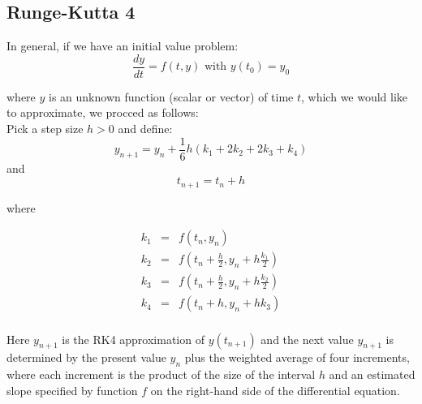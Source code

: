 \documentclass[12pt,a4paper,twoside]{report}
\begin{document}
\subsection{Runge-Kutta 4}
In general, if we have an initial value problem:
\begin{equation}
  \frac{dy}{dt} = f(t,y) \text{ with } y(t_0) = y_0
\end{equation}

where \( y \) is an unknown function (scalar or vector) of time \( t \), which we 
would like to approximate, we procced as follows:\\
Pick a step size \( h > 0 \) and define:
\begin{equation}
  y_{n+1} = y_n + \frac{1}{6} h (k_1 + 2 k_2 + 2 k_3 + k_4)
\end{equation}
and
\begin{equation}
  t_{n+1} = t_n + h
\end{equation}

where

\begin{equation}
  \begin{array}{lcl}
  k_1 & = & f(t_n, y_n) \\
  k_2 & = & f(t_n + \frac{h}{2}, y_n + h\frac{k_1}{2}) \\
  k_3 & = & f(t_n + \frac{h}{2}, y_n + h\frac{k_2}{2}) \\
  k_4 & = & f(t_n + h, y_n + h k_3) \\
  \end{array}
\end{equation}

Here \( y_{n+1} \) is the RK4 approximation of \( y( t_{n+1} ) \) and the next value 
\( y_{n+1} \) is determined by the present value \( y_n \) plus the weighted average 
of four increments, where each increment is the product of the size of the interval 
\(h\) and an estimated slope specified by function \(f\) on the right-hand side 
of the differential equation.
\end{document}
